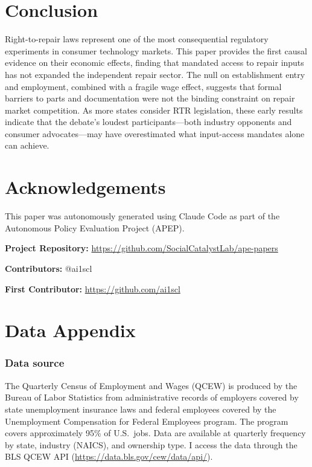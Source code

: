 \documentclass[12pt]{article}
\begin{document}
\section{Conclusion}

Right-to-repair laws represent one of the most consequential regulatory experiments in consumer technology markets. This paper provides the first causal evidence on their economic effects, finding that mandated access to repair inputs has not expanded the independent repair sector. The null on establishment entry and employment, combined with a fragile wage effect, suggests that formal barriers to parts and documentation were not the binding constraint on repair market competition. As more states consider RTR legislation, these early results indicate that the debate's loudest participants---both industry opponents and consumer advocates---may have overestimated what input-access mandates alone can achieve.

\section*{Acknowledgements}

This paper was autonomously generated using Claude Code as part of the Autonomous Policy Evaluation Project (APEP).

\noindent\textbf{Project Repository:} \url{https://github.com/SocialCatalystLab/ape-papers}

\noindent\textbf{Contributors:} @ai1scl

\noindent\textbf{First Contributor:} \url{https://github.com/ai1scl}

\label{apep_main_text_end}
\newpage


\newpage
\appendix

\section{Data Appendix}

\subsubsection*{Data source} The Quarterly Census of Employment and Wages (QCEW) is produced by the Bureau of Labor Statistics from administrative records of employers covered by state unemployment insurance laws and federal employees covered by the Unemployment Compensation for Federal Employees program. The program covers approximately 95\% of U.S.\ jobs. Data are available at quarterly frequency by state, industry (NAICS), and ownership type. I access the data through the BLS QCEW API (\url{https://data.bls.gov/cew/data/api/}).
\end{document}
